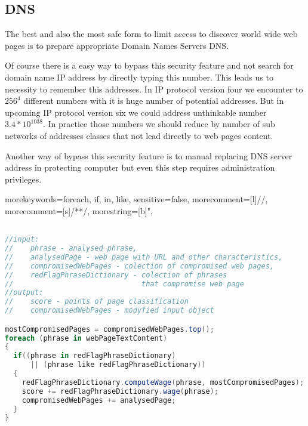 \documentclass[9pt,a4paper]{extarticle}
\begin{document}
\begin{multicols}{2}
\section{DNS}
The best and also the most safe form to limit access to discover world wide web pages is to prepare appropriate Domain Names Servers DNS\cite{j._postel_domain_1984, p._mockapetris_domain_1987, p._mockapetris_domain2_1987, yakov_rekhter_dynamic_1997, r._elz_clarifications_1997, d._eastlake_domain_1999}.

Of course there is a easy way to bypass this security feature and not search for domain name IP address by directly typing this number. This leads us to necessity to remember this addresses. In IP protocol version four we encounter to \({256}^{4}\) different numbers with it is huge number of potential addresses. But in upcoming IP protocol version six we could address unthinkable number \(3.4*10^{1038}\). In practice those numbers we should reduce by number of sub networks of addresses classes that not lead directly to web pages content.

Another way of bypass this security feature is to manual replacing DNS server address in protecting computer but even this step requires administration privileges.

\end{multicols}

%
 {morekeywords={foreach, if, in, like}, sensitive=false, morecomment=[l]{//}, morecomment=[s]{/*}{*/}, morestring=[b]", }
\lstset{
numbers=left, numberstyle=\tiny, stepnumber=1, numbersep=5pt
}
\begin{lstlisting}[title={Alg 1. Podstawowy algorytm klasyfikacji stron internetowych}, language=csharp, label=alg1] 

//input: 
//    phrase - analysed phrase, 
//    analysedPage - web page with URL and other characteristics, 
//    compromisedWebPages - colection of compromised web pages, 
//    redFlagPhraseDictionary - colection of phrases 
//                              that compromise web page
//output:
//    score - points of page classification
//    compromisedWebPages - modyfied input object

mostCompromisedPages = compromisedWebPages.top();
foreach (phrase in webPageTextContent)
{  
  if((phrase in redFlagPhraseDictionary) 
      || (phrase like redFlagPhraseDictionary))
  {
    redFlagPhraseDictionary.computeWage(phrase, mostCompromisedPages);
    score += redFlagPhraseDictionary.wage(phrase);
    compromisedWebPages += analysedPage;
  }
}
\end{lstlisting}
\end{document}

